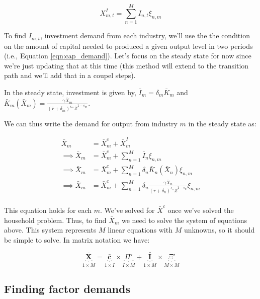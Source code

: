 \documentclass[letterpaper,12pt]{article}
\theoremstyle{definition}
\begin{document}
\begin{equation}
X^{I}_{m,t}= \sum_{n=1}^{M} I_{n,t}\xi_{n,m}
\end{equation} 

To find $I_{m,t}$, investment demand from each industry, we'll use the the condition on the amount of capital needed to produced a given output level in two periods (i.e., Equation \ref{eqn:cap_demand}).  Let's focus on the steady state for now since we're just updating that at this time (this method will extend to the transition path and we'll add that in a coupel steps).

In the steady state, investment is given by, $\bar{I}_{m}=\delta_{m}\bar{K}_{m}$ and $\bar{K}_{m}(\bar{X}_{m}) =  \frac{\gamma \bar{X}_{m}}{\left(\bar{r}+\delta_{m}\right)^{\epsilon_{m}}\bar{Z}^{1-\epsilon_{m}}}$.

We can thus write the demand for output from industry $m$ in the steady state as:

\begin{equation}
\begin{split}
\bar{X}_{m} &= \bar{X}^{c}_{m} + \bar{X}^{I}_{m} \\
\implies \bar{X}_{m} & = \bar{X}^{c}_{m} +  \sum_{n=1}^{M} \bar{I}_{n}\xi_{n,m} \\
\implies \bar{X}_{m} & = \bar{X}^{c}_{m} +  \sum_{n=1}^{M} \delta_{n}\bar{K}_{n}(\bar{X}_{n})\xi_{n,m} \\
\implies \bar{X}_{m} & = \bar{X}^{c}_{m} +  \sum_{n=1}^{M} \delta_{n} \frac{\gamma \bar{X}_{n}}{\left(\bar{r}+\delta_{n}\right)^{\epsilon_{n}}\bar{Z}^{1-\epsilon_{n}}}\xi_{n,m} \\
\end{split}
\end{equation}

This equation holds for each $m$.  We've solved for $\bar{X}^{c}$ once we've solved the household problem.  Thus, to find $\bar{X}_{m}$ we need to solve the system of equations above.  This system represents $M$ linear equations with $M$ unknowns, so it should be simple to solve.  In matrix notation we have:

\begin{equation}
\underbrace{\boldsymbol{\bar{X}}}_{1\times M}= \underbrace{\boldsymbol{\bar{c}}}_{1 \times I} \times \underbrace{\Pi'}_{I\times M} + \underbrace{\boldsymbol{\bar{I}}}_{1 \times M} \times \underbrace{\Xi'}_{M\times M}
\end{equation}

\subsection*{Finding factor demands}
\end{document}
